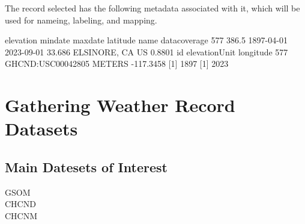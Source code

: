 \documentclass{article}
\begin{document}
\begin{knitrout}
\begin{kframe}
\begin{alltt}
 \hlkwb{=} \hlstd{(}\hlstd{=}\hlstd{,}
                              \hlstd{=} \hlstd{,}
                              \hlstd{=} \hlstd{(}\hlstd{,} \hlstd{))}

 \hlkwb{=} \hlopt{$}
\hlstd{\}}


\hlopt{$} \hlkwb{<-} \hlstd{(}\hlstd{,} \hlopt{$}
\end{alltt}
\end{kframe}
\end{knitrout}

The record selected has the following metadata associated with it, which will be used for nameing, labeling, and mapping. 

    elevation    mindate    maxdate latitude            name datacoverage
577     386.5 1897-04-01 2023-09-01   33.686 ELSINORE, CA US       0.8801
                   id elevationUnit longitude
577 GHCND:USC00042805        METERS -117.3458
[1] 1897
[1] 2023


\section{Gathering Weather Record Datasets}

\subsection{Main Datesets of Interest}

\begin{description}
  \item[GSOM]
  \item[CHCND]
  \item[CHCNM]
\end{description}
\end{document}
